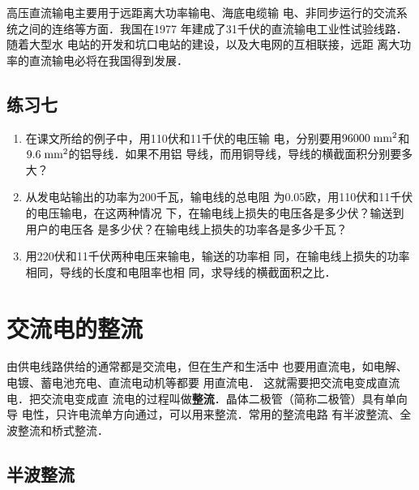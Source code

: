 高压直流输电主要用于远距离大功率输电、海底电缆输
电、非同步运行的交流系统之间的连络等方面．我国在1977
年建成了31千伏的直流输电工业性试验线路．随着大型水
电站的开发和坑口电站的建设，以及大电网的互相联接，远距
离大功率的直流输电必将在我国得到发展．

\subsection*{练习七}
\begin{enumerate}
    \item 在课文所给的例子中，用110伏和11千伏的电压输
电，分别要用$96000\;\text{mm}^2 $和$9.6\;\text{mm}^2 $的铝导线．如果不用铝
导线，而用铜导线，导线的横截面积分别要多大？
\item 从发电站输出的功率为200千瓦，输电线的总电阻
为0.05欧，用110伏和11千伏的电压输电，在这两种情况
下，在输电线上损失的电压各是多少伏？输送到用户的电压各
是多少伏？在输电线上损失的功率各是多少千瓦？
\item 用220伏和11千伏两种电压来输电，输送的功率相
同，在输电线上损失的功率相同，导线的长度和电阻率也相
同，求导线的横截面积之比．
\end{enumerate}

\section{交流电的整流}
由供电线路供给的通常都是交流电，但在生产和生活中
也要用直流电，如电解、电镀、蓄电池充电、直流电动机等都要
用直流电．
这就需要把交流电变成直流电．把交流电变成直
流电的过程叫做\textbf{整流}．晶体二极管（简称二极管）具有单向导
电性，只许电流单方向通过，可以用来整流．常用的整流电路
有半波整流、全波整流和桥式整流．

\subsection{半波整流}

